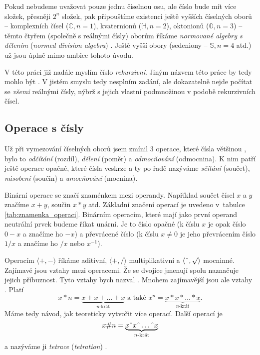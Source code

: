 Pokud nebudeme uvažovat pouze jednu číselnou osu, ale číslo bude mít více složek, přesněji $2^n$ složek, pak připouštíme existenci ještě vyšších číselných oborů -- komplexních čísel ($\mathbb{C}, n = 1$), kvaternionů ($\mathbb{H}, n = 2$), oktonionů ($\mathbb{O}, n = 3$) -- těmto čtyřem (společně s reálnými čísly) oborům říkáme \textit{normované algebry s dělením} (\textit{normed division algebra}) \cite{DAaQT}. Ještě vyšší obory (sedeniony -- $\mathbb{S}, n = 4$ atd.) už jsou úplně mimo ambice tohoto úvodu.

V této práci již nadále  myslím číslo \textit{rekurzivní}. Jiným názvem této práce by tedy mohlo být . V jistém smyslu tedy nesplním zadání, ale dokazatelně nejde počítat se \textit{všemi} reálnými čísly, nýbrž s jejich vlastní podmnožinou v podobě rekurzivních čísel.

\subsection{Operace s čísly}
\label{operace_s_cisly}
Už při vymezování číselných oborů jsem zmínil 3 operace, které čísla většinou , bylo to \textit{odčítání} (rozdíl), \textit{dělení} (poměr) a \textit{odmocňování} (odmocnina). K nim patří ještě operace opačné, které čísla veskrze  a ty po řadě nazýváme \textit{sčítání} (součet), \textit{násobení} (součin) a \textit{umocňování} (mocnina).

Binární operace se značí znaménkem mezi operandy. Například součet čísel $x$ a $y$ značíme $x+y$, součin $x*y$ atd. Základní značení operací je uvedeno v~tabulce \ref{tab:znamenka_operaci}. Binárním operacím, které mají jako první operand neutrální prvek budeme říkat unární. Je to číslo opačné (k číslu $x$ je opak číslo $0-x$ a značíme ho $-x$) a převrácené číslo (k číslu $x\neq0$ je jeho převrácením číslo $1/x$ a značíme ho $/x$ nebo $x^{-1}$).

Operacím $\langle +, -\rangle$ říkáme aditivní, $\langle +, /\rangle$ multiplikativní a $\langle\string^ , \surd\rangle$ mocninné. Zajímavé jsou vztahy mezi operacemi. Že se dvojice jmenují spolu naznačuje jejich příbuznost. Tyto vztahy bych nazval . Mnohem zajímavější jsou ale vztahy . Platí
\begin{equation}
x*n = \underbrace{x + x + \ldots + x}_{n\text{-krát}} \text{~a také~} x^n = \underbrace{x * x * \ldots * x}_{n\text{-krát}}.
\end{equation}
Máme tedy návod, jak teoreticky vytvořit více operací. Další operací je 
\begin{equation}
x\#n = \underbrace{x \string^ x \string^ \ldots \string^ x}_{n\text{-krát}}
\end{equation}
a nazýváme ji \textit{tetrace} (\textit{tetration}) \cite{Operations}.

